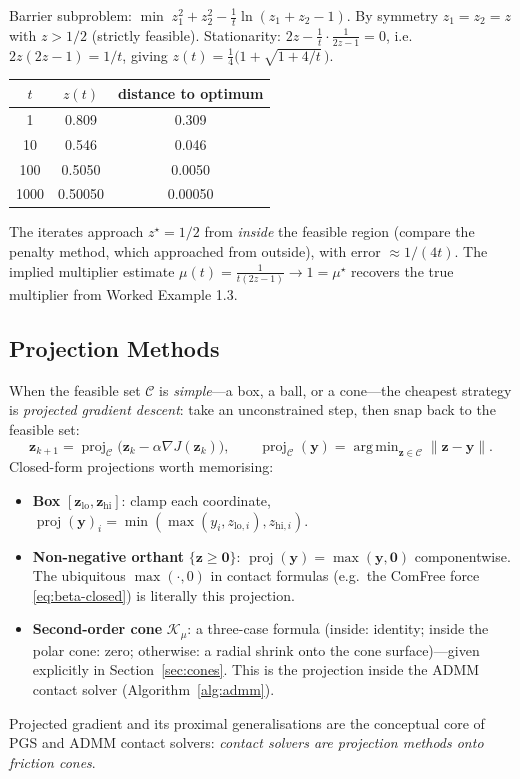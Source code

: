 \documentclass[11pt,twoside]{report}
\theoremstyle{definition}
\theoremstyle{plain}
\theoremstyle{remark}
\newcommand{\0}{\bm{0}}
\newcommand{\Kc}{\mathcal{K}}
\DeclareMathOperator*{\argmin}{arg\,min}
\DeclareMathOperator{\proj}{proj}
\begin{document}
\begin{examplebox}
Barrier subproblem:
$\min\;z_{1}^{2}+z_{2}^{2}-\tfrac{1}{t}\ln(z_{1}+z_{2}-1)$.
By symmetry $z_{1}=z_{2}=z$ with $z>1/2$ (strictly feasible).
Stationarity: $2z-\tfrac{1}{t}\cdot\tfrac{1}{2z-1}=0$, i.e.\
$2z(2z-1)=1/t$, giving
$z(t)=\tfrac14\bigl(1+\sqrt{1+4/t}\,\bigr)$.
\begin{center}
\begin{tabular}{ccc}
\toprule
$t$ & $z(t)$ & distance to optimum\\
\midrule
1 & 0.809 & 0.309\\
10 & 0.546 & 0.046\\
100 & 0.5050 & 0.0050\\
1000 & 0.50050 & 0.00050\\
\bottomrule
\end{tabular}
\end{center}
The iterates approach $z^{\star}=1/2$ from \emph{inside} the feasible
region (compare the penalty method, which approached from outside), with
error $\approx 1/(4t)$. The implied multiplier estimate
$\mu(t)=\tfrac{1}{t(2z-1)}\to 1=\mu^{\star}$ recovers the true
multiplier from Worked Example 1.3.
\end{examplebox}

\subsection{Projection Methods}
When the feasible set $\mathcal{C}$ is \emph{simple}---a box, a ball, or
a cone---the cheapest strategy is \emph{projected gradient descent}:
take an unconstrained step, then snap back to the feasible set:
\begin{equation}\label{eq:proj-grad}
\bm{z}_{k+1}=\proj_{\mathcal{C}}\bigl(\bm{z}_{k}-\alpha\nabla J(\bm{z}_{k})\bigr),
\qquad
\proj_{\mathcal{C}}(\bm{y})=\argmin_{\bm{z}\in\mathcal{C}}\|\bm{z}-\bm{y}\|.
\end{equation}
Closed-form projections worth memorising:
\begin{itemize}
\item \textbf{Box} $[\bm{z}_{\text{lo}},\bm{z}_{\text{hi}}]$:
      clamp each coordinate,
      $\proj(\bm{y})_{i}=\min(\max(y_{i},z_{\text{lo},i}),z_{\text{hi},i})$.
\item \textbf{Non-negative orthant} $\{\bm{z}\ge\0\}$:
      $\proj(\bm{y})=\max(\bm{y},\0)$ componentwise. The ubiquitous
      $\max(\cdot,0)$ in contact formulas (e.g.\ the ComFree force
      \eqref{eq:beta-closed}) is literally this projection.
\item \textbf{Second-order cone} $\Kc_{\mu}$: a three-case formula
      (inside: identity; inside the polar cone: zero; otherwise: a
      radial shrink onto the cone surface)---given explicitly in
      Section~\ref{sec:cones}. This is the projection inside the
      ADMM contact solver (Algorithm~\ref{alg:admm}).
\end{itemize}
Projected gradient and its proximal generalisations are the conceptual
core of PGS and ADMM contact solvers: \emph{contact solvers are
projection methods onto friction cones}.
\end{document}
